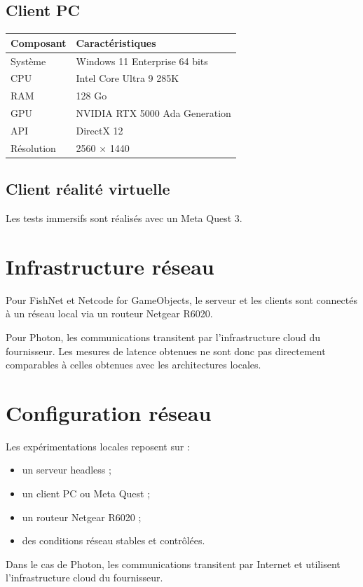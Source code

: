 \documentclass[11pt,a4paper]{article}
\begin{document}
\subsection{Client PC}

\begin{longtable}{ll}
\toprule
Composant & Caractéristiques \\
\midrule
Système & Windows 11 Enterprise 64 bits \\
CPU & Intel Core Ultra 9 285K \\
RAM & 128 Go \\
GPU & NVIDIA RTX 5000 Ada Generation \\
API & DirectX 12 \\
Résolution & 2560 $\times$ 1440 \\
\bottomrule
\end{longtable}

\subsection{Client réalité virtuelle}

Les tests immersifs sont réalisés avec un Meta Quest 3.

\section{Infrastructure réseau}

Pour FishNet et Netcode for GameObjects, le serveur et les clients sont connectés à un réseau local via un routeur Netgear R6020.

Pour Photon, les communications transitent par l'infrastructure cloud du fournisseur. Les mesures de latence obtenues ne sont donc pas directement comparables à celles obtenues avec les architectures locales.

\section{Configuration réseau}

Les expérimentations locales reposent sur :

\begin{itemize}
\item un serveur headless ;
\item un client PC ou Meta Quest ;
\item un routeur Netgear R6020 ;
\item des conditions réseau stables et contrôlées.
\end{itemize}

Dans le cas de Photon, les communications transitent par Internet et utilisent l'infrastructure cloud du fournisseur.
\end{document}
